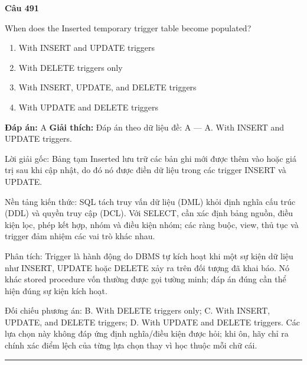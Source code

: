 \documentclass[11pt,a4paper]{article}
\newenvironment{question}[1]{%
  \par\vspace{1em}\noindent\textbf{\large Câu #1}\par\vspace{0.4em}
}{%
  \par\vspace{1em}\hrule\vspace{0.6em}
}
\newenvironment{choices}{%
  \begin{enumerate}[label=\textbf{\Alph*.},leftmargin=2.2em,itemsep=2pt,topsep=3pt]
}{%
  \end{enumerate}
}
\newcommand{\choice}{\item}
\begin{document}
\begin{question}{491}
When does the Inserted temporary trigger table become populated?
\begin{choices}
\choice With INSERT and UPDATE triggers
\choice With DELETE triggers only
\choice With INSERT, UPDATE, and DELETE triggers
\choice With UPDATE and DELETE triggers
\end{choices}
\textbf{Đáp án:} A
\textbf{Giải thích:} Đáp án theo dữ liệu đề: A — A. With INSERT and UPDATE triggers.

Lời giải gốc: Bảng tạm Inserted lưu trữ các bản ghi mới được thêm vào hoặc giá trị sau khi cập nhật, do đó nó được điền dữ liệu trong các trigger INSERT và UPDATE.

Nền tảng kiến thức: SQL tách truy vấn dữ liệu (DML) khỏi định nghĩa cấu trúc (DDL) và quyền truy cập (DCL). Với SELECT, cần xác định bảng nguồn, điều kiện lọc, phép kết hợp, nhóm và điều kiện nhóm; các ràng buộc, view, thủ tục và trigger đảm nhiệm các vai trò khác nhau.

Phân tích: Trigger là hành động do DBMS tự kích hoạt khi một sự kiện dữ liệu như INSERT, UPDATE hoặc DELETE xảy ra trên đối tượng đã khai báo. Nó khác stored procedure vốn thường được gọi tường minh; đáp án đúng cần thể hiện đúng sự kiện kích hoạt.

Đối chiếu phương án: B. With DELETE triggers only; C. With INSERT, UPDATE, and DELETE triggers; D. With UPDATE and DELETE triggers. Các lựa chọn này không đáp ứng định nghĩa/điều kiện được hỏi; khi ôn, hãy chỉ ra chính xác điểm lệch của từng lựa chọn thay vì học thuộc mỗi chữ cái.
\end{question}
\end{document}
